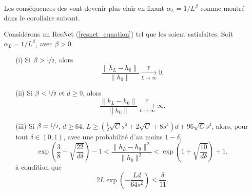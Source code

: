 Les conséquences des  vont devenir plus clair en fixant $ \alpha _L = 1/L ^\beta $ comme montré dans le corollaire suivant.
\begin{cor}\label{cor4}
    Considérons un ResNet (\ref{resnet_equation}) tel que les  soient satisfaites. Soit $ \alpha_L = 1/L^\beta $, avec $ \beta > 0 $.
    \begin{itemize}
        \item[(i)] Si $ \beta > \nicefrac{1}{2} $, alors
        \[
            \frac{\|h_L - h_0\|}{\|h_0\|} \xrightarrow[L \to \infty]{\mathbb{P}} 0.
        \]
        \item[(ii)] Si $ \beta < \nicefrac{1}{2}$ et $d \geqslant 9 $, alors
        \[
            \frac{\|h_L - h_0\|}{\|h_0\|} \xrightarrow[L \to \infty]{\mathbb{P}} \infty.
        \]
        \item[(iii)] Si $ \beta = \nicefrac{1}{2} $, $ d \geqslant 64$, $L \geqslant (\frac{1}{2}\sqrt{C}s^4 + 2\sqrt{C} + 8s^4)d + 96\sqrt{C} s^4 $, alors, pour tout $ \delta \in (0, 1) $, avec une probabilité d'au moins $ 1 - \delta $,
        \[
            \exp\left(\frac{3}{8} - \sqrt{\frac{22}{d\delta}}\right) - 1 < \frac{\|h_L - h_0\|^2}{\|h_0\|^2} < \exp\left(1 + \sqrt{\frac{10}{d\delta}}\right) + 1,
        \]
        à condition que
        \[
            2L \exp\left(-\frac{Ld}{64s^2}\right) \leqslant \frac{\delta}{11}.
        \]
    \end{itemize}
\end{cor}

